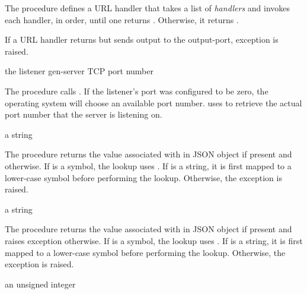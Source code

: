 The  procedure defines a URL handler
that takes a list of \emph{handlers} and invokes each handler, in
order, until one returns . Otherwise, it returns .

If a URL handler returns  but sends output to the
output-port, exception  is raised.

\begin{procedure}
\end{procedure}
\returns{} the listener gen-server TCP port number

The  procedure calls . If the listener's port was
configured to be zero, the operating system will choose an available
port number.   uses
 to retrieve the actual port number that
the server is listening on.

\begin{procedure}
\end{procedure}
\returns{} a string \alt{} 

The  procedure returns the value associated
with  in JSON object  if present and 
otherwise.  If  is a symbol, the lookup uses .  If
 is a string, it is first mapped to a lower-case symbol
before performing the lookup.  Otherwise, the exception
 is raised.

\begin{procedure}
\end{procedure}
\returns{} a string

The  procedure returns the value associated with
 in JSON object  if present and raises exception
 otherwise.  If  is
a symbol, the lookup uses .  If  is a string, it
is first mapped to a lower-case symbol before performing the lookup.
Otherwise, the exception 
is raised.

\begin{procedure}
\end{procedure}
\returns{} an unsigned integer \alt{} 

